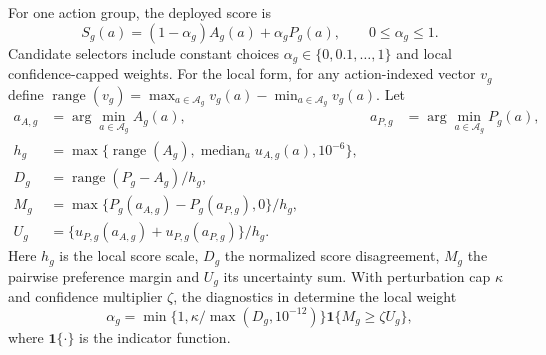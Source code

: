 For one action group, the deployed score is
\begin{equation}
 S_g(a)=(1-\alpha_g)A_g(a)+\alpha_gP_g(a),
 \qquad 0\leq\alpha_g\leq1.
 \label{eq:anchored-blend}
\end{equation}
Candidate selectors include constant choices
$\alpha_g\in\{0,0.1,\ldots,1\}$ and local confidence-capped weights.  For the
local form, for any action-indexed vector $v_g$ define
$\operatorname{range}(v_g)=\max_{a\in\mathcal A_g}v_g(a)-
\min_{a\in\mathcal A_g}v_g(a)$.  Let
\begin{equation}
\begin{aligned}
 a_{A,g}&=\arg\min_{a\in\mathcal A_g}A_g(a),
 &a_{P,g}&=\arg\min_{a\in\mathcal A_g}P_g(a),\\
 h_g &= \max\{\operatorname{range}(A_g),
                  \operatorname{median}_{a}u_{A,g}(a),10^{-6}\},\\
 D_g &= \operatorname{range}(P_g-A_g)/h_g,\\
 M_g &= \max\{P_g(a_{A,g})-P_g(a_{P,g}),0\}/h_g,\\
 U_g &= \{u_{P,g}(a_{A,g})+u_{P,g}(a_{P,g})\}/h_g.
\end{aligned}
\label{eq:local-diagnostics}
\end{equation}
Here $h_g$ is the local score scale, $D_g$ the normalized score disagreement,
$M_g$ the pairwise preference margin and $U_g$ its uncertainty sum.  With
perturbation cap $\kappa$ and confidence multiplier $\zeta$, the diagnostics
in  determine the local weight
\begin{equation}
 \alpha_g=\min\{1,\kappa/\max(D_g,10^{-12})\}
           \mathbf{1}\{M_g\geq\zeta U_g\},
 \label{eq:local-alpha}
\end{equation}
where $\mathbf{1}\{\cdot\}$ is the indicator function.

